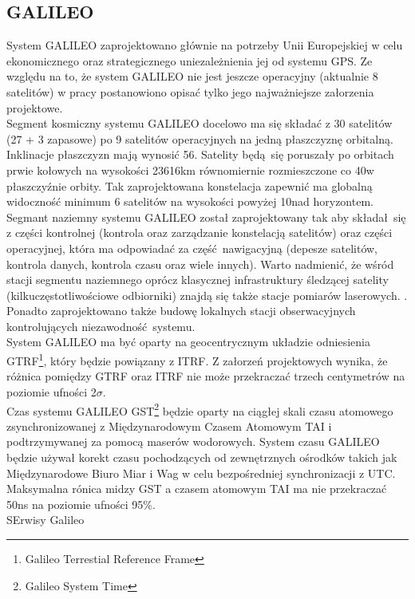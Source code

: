 	\subsection{GALILEO}
System GALILEO zaprojektowano głównie na potrzeby Unii Europejskiej w celu ekonomicznego oraz strategicznego uniezależnienia jej od systemu GPS.
Ze względu na to, że system GALILEO nie jest jeszcze operacyjny (aktualnie 8 satelitów) w pracy postanowiono opisać tylko jego najważniejsze załorzenia projektowe.\\
\indent Segment kosmiczny systemu GALILEO docelowo ma się składać z 30 satelitów (27 + 3 zapasowe) po 9 satelitów operacyjnych na jedną płaszczyznę orbitalną.
Inklinacje płaszczyzn mają wynosić 56\degree. Satelity będą się poruszały po orbitach prwie kołowych na wysokości 23616km równomiernie rozmieszczone co 40\degree w 
płaszczyźnie orbity. Tak zaprojektowana konstelacja zapewnić ma globalną widoczność minimum 6 satelitów na wysokości powyżej 10\degree nad horyzontem.\\
\indent Segmant naziemny systemu GALILEO został zaprojektowany tak aby składał się z części kontrolnej (kontrola oraz zarządzanie konstelacją satelitów) oraz 
części operacyjnej, która ma odpowiadać za część nawigacyjną (depesze satelitów, kontrola danych, kontrola czasu oraz wiele innych). Warto nadmienić,
że wśród stacji segmentu naziemnego oprócz klasycznej infrastruktury śledzącej satelity (kilkuczęstotliwościowe odbiorniki) znajdą się także stacje pomiarów laserowych.
\cite[][strona 380]{hofmann_gnss}. Ponadto zaprojektowano także budowę lokalnych stacji obserwacyjnych kontrolujących niezawodność systemu.\\
\indent System GALILEO ma być oparty na geocentrycznym układzie odniesienia GTRF\footnote{Galileo Terrestial Reference Frame}, który będzie powiązany z ITRF.
Z załorzeń projektowych wynika, że różnica pomiędzy GTRF oraz ITRF nie może przekraczać trzech centymetrów na poziomie ufności 2$\sigma$.\\
\indent Czas systemu GALILEO GST\footnote{Galileo System Time} będzie oparty na ciągłej skali czasu atomowego zsynchronizowanej z Międzynarodowym Czasem Atomowym TAI i
podtrzymywanej za pomocą maserów wodorowych. System czasu GALILEO będzie używał korekt czasu pochodzących od zewnętrznych ośrodków takich jak Międzynarodowe 
Biuro Miar i Wag w celu bezpośredniej synchronizacji z UTC. Maksymalna rónica midzy GST a czasem atomowym TAI ma nie przekraczać 50ns na poziomie ufności 95\%.\\
\indent SErwisy Galileo

